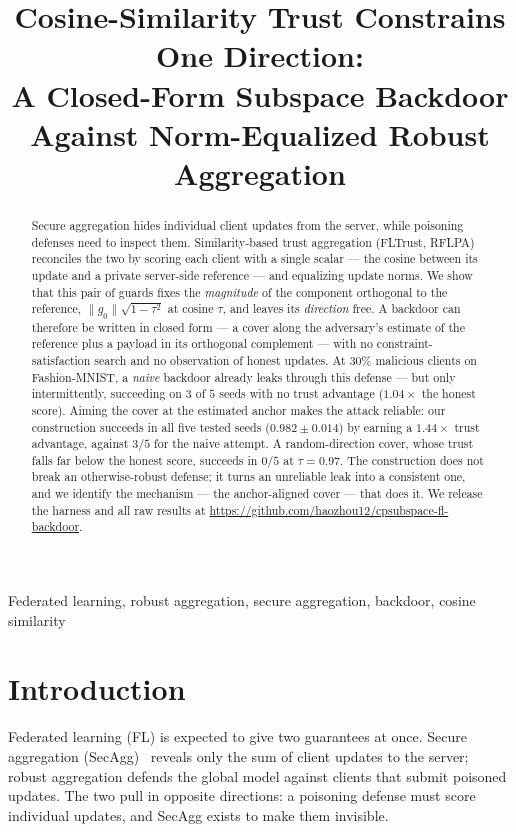 \documentclass{article}
\title{Cosine-Similarity Trust Constrains One Direction:\\ A Closed-Form Subspace Backdoor Against Norm-Equalized Robust Aggregation}
\begin{document}
\maketitle

\begin{abstract}
Secure aggregation hides individual client updates from the server, while poisoning
defenses need to inspect them. Similarity-based trust aggregation (FLTrust, RFLPA)
reconciles the two by scoring each client with a single scalar --- the cosine
between its update and a private server-side reference --- and equalizing update
norms. We show that this pair of guards fixes the \emph{magnitude} of the
component orthogonal to the reference, $\|g_0\|\sqrt{1-\tau^{2}}$ at cosine
$\tau$, and leaves its \emph{direction} free. A backdoor can therefore be written
in closed form --- a cover along the adversary's estimate of the reference plus a
payload in its orthogonal complement --- with no constraint-satisfaction search
and no observation of honest updates. At $30\%$ malicious clients on Fashion-MNIST, a \emph{naive} backdoor already
leaks through this defense --- but only intermittently, succeeding on $3$ of $5$
seeds with no trust advantage ($1.04\times$ the honest score). Aiming the cover at the estimated anchor makes the attack reliable: our construction succeeds in all five tested seeds ($0.982\pm0.014$) by earning a $1.44\times$ trust advantage, against $3/5$ for the naive attempt. A random-direction cover, whose trust falls far below the honest score, succeeds in $0/5$ at $\tau=0.97$. The construction does not break an otherwise-robust defense; it turns an unreliable leak into a consistent one, and we identify the mechanism --- the anchor-aligned cover --- that does it. We release
the harness and all raw results at
\url{https://github.com/haozhou12/cpsubspace-fl-backdoor}.
\end{abstract}

\begin{keywords}
Federated learning, robust aggregation, secure aggregation, backdoor, cosine similarity
\end{keywords}

\section{Introduction}
\label{sec:intro}
Federated learning (FL) is expected to give two guarantees at once. Secure
aggregation (SecAgg)~\cite{secagg} reveals only the sum of client updates to the
server; robust aggregation defends the global model against clients that submit
poisoned updates. The two pull in opposite directions: a poisoning defense must
score individual updates, and SecAgg exists to make them invisible.
\end{document}
